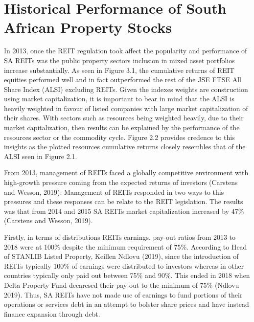 \documentclass[11pt,preprint, authoryear]{elsarticle}
\numberwithin{equation}{section}
\numberwithin{figure}{section}
\numberwithin{table}{section}
\begin{document}
\hypertarget{historical-performance-of-south-african-property-stocks}{%
\section{Historical Performance of South African Property
Stocks}\label{historical-performance-of-south-african-property-stocks}}

In 2013, once the REIT regulation took affect the popularity and
performance of SA REITs was the public property sectors inclusion in
mixed asset portfolios increase substantially. As seen in Figure 3.1,
the cumulative returns of REIT equities performed well and in fact
outperformed the rest of the JSE FTSE All Share Index (ALSI) excluding
REITs. Given the indexes weights are construction using market
capitalization, it is important to bear in mind that the ALSI is heavily
weighted in favour of listed companies with large market capitalization
of their shares. With sectors such as resources being weighted heavily,
due to their market capitalization, then results can be explained by the
performance of the resources sector or the commodity cycle. Figure 2.2
provides credence to this insights as the plotted resources cumulative
returns closely resembles that of the ALSI seen in Figure 2.1.

From 2013, management of REITs faced a globally competitive environment
with high-growth pressure coming from the expected returns of investors
(Carstens and Wesson, 2019). Management of REITs responded in two ways
to this pressures and these responses can be relate to the REIT
legislation. The results was that from 2014 and 2015 SA REITs market
capitalization increased by 47\% (Carstens and Wesson, 2019).

Firstly, in terms of distributions REITs earnings, pay-out ratios from
2013 to 2018 were at 100\% despite the minimum requirement of 75\%.
According to Head of STANLIB Listed Property, Keillen Ndlovu (2019),
since the introduction of REITs typically 100\% of earnings were
distributed to investors whereas in other countries typically only paid
out between 75\% and 90\%. This ended in 2018 when Delta Property Fund
decaresed their pay-out to the minimum of 75\% (Ndlovu 2019). Thus, SA
REITs have not made use of earnings to fund portions of their operations
or services debt in an attempt to bolster share prices and have instead
finance expansion through debt.
\end{document}
